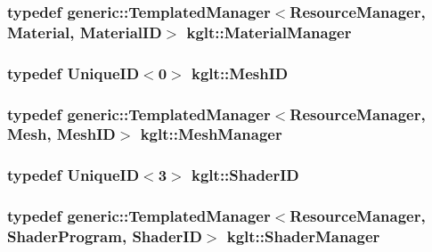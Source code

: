 \hypertarget{namespacekglt_a912e51432ed9811883e2c8b07491d3c6}{
\subsubsection[{Material\-Manager}]{\setlength{\rightskip}{0pt plus 5cm}typedef {\bf generic\-::\-Templated\-Manager}$<${\bf Resource\-Manager}, {\bf Material}, {\bf Material\-I\-D}$>$ {\bf kglt\-::\-Material\-Manager}}}\label{namespacekglt_a912e51432ed9811883e2c8b07491d3c6}
\hypertarget{namespacekglt_a525b047f668a129a0b102be7f2fe32be}{
\subsubsection[{Mesh\-I\-D}]{\setlength{\rightskip}{0pt plus 5cm}typedef {\bf Unique\-I\-D}$<$0$>$ {\bf kglt\-::\-Mesh\-I\-D}}}\label{namespacekglt_a525b047f668a129a0b102be7f2fe32be}
\hypertarget{namespacekglt_a7fe8401d2c2b7af53d42e91809cf3042}{
\subsubsection[{Mesh\-Manager}]{\setlength{\rightskip}{0pt plus 5cm}typedef {\bf generic\-::\-Templated\-Manager}$<${\bf Resource\-Manager}, {\bf Mesh}, {\bf Mesh\-I\-D}$>$ {\bf kglt\-::\-Mesh\-Manager}}}\label{namespacekglt_a7fe8401d2c2b7af53d42e91809cf3042}
\hypertarget{namespacekglt_a2aafe4bf33d26659020117cad360422f}{
\subsubsection[{Shader\-I\-D}]{\setlength{\rightskip}{0pt plus 5cm}typedef {\bf Unique\-I\-D}$<$3$>$ {\bf kglt\-::\-Shader\-I\-D}}}\label{namespacekglt_a2aafe4bf33d26659020117cad360422f}
\hypertarget{namespacekglt_ae2013bec7afa0f68c33ffc4eba21bf1f}{
\subsubsection[{Shader\-Manager}]{\setlength{\rightskip}{0pt plus 5cm}typedef {\bf generic\-::\-Templated\-Manager}$<${\bf Resource\-Manager}, {\bf Shader\-Program}, {\bf Shader\-I\-D}$>$ {\bf kglt\-::\-Shader\-Manager}}}\label{namespacekglt_ae2013bec7afa0f68c33ffc4eba21bf1f}
